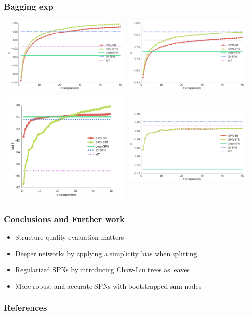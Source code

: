 \documentclass[xcolor={usenames,dvipsnames,svgnames}, compress]{beamer}
\begin{document}
\begin{frame}
  \frametitle{Bagging exp}
  \begin{table}[ht]
    \centering
    \begin{tabular}[t]{c c}
      \includegraphics[width=0.4\linewidth]{figures/curves/baudio}&\includegraphics[width=0.4\linewidth]{figures/curves/bnetflix}\\
      \includegraphics[width=0.4\linewidth]{figures/curves/dna}&\includegraphics[width=0.4\linewidth]{figures/curves/nltcs}\\
    \end{tabular}
  \end{table}
\end{frame}

\begin{frame}
  \frametitle{Conclusions and Further work}
  \begin{itemize}
  \item Structure quality evaluation matters
  \item Deeper networks by applying a simplicity bias when splitting
  \item Regularized SPNs by introducing Chow-Liu trees as leaves
    \item More robust and accurate SPNs with bootstrapped sum nodes
  \end{itemize}


  
\end{frame}

\begin{frame}
  \frametitle{References}
  \setlength\bibitemsep{8pt}
  \printbibliography
\end{frame}
\end{document}
